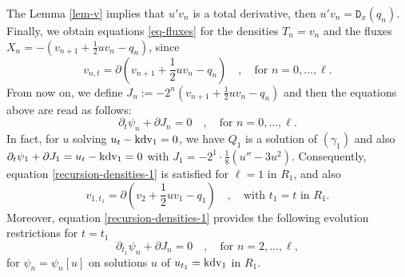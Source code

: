 \documentclass[a4paper,12pt]{article}
\def\kdv{\rm kdv}
\def\D{\texttt{D}}
\begin{document}
The Lemma \ref{lem-v} implies that  $u' v_n$ is a total derivative, then $u' v_n =\D_x(q_n )$. Finally, we obtain equations \eqref{eq-fluxes} for the densities $T_n = v_n $ and the fluxes $X_n =-(v_{n+1} +\frac12  uv_{n}-q_n)$, since
\begin{equation*}
   v_{n,t}= 
   \partial \left( v_{n+1} +\frac12  uv_{n}-q_n \right) \quad , \quad \textrm{for } n=0, \dots ,\ell .   
\end{equation*}
From now on, we define $J_n := -2^{n} (v_{n+1} +\frac12  uv_{n}-q_n )$ and then the equations above are read as follows:
\begin{equation}\label{eq-time-v}
    \partial_t \psi_n + \partial J_n =0 \quad , \quad \textrm{for } n=0, \dots ,\ell . 
\end{equation}
In fact, for $u$ solving $u_t -\kdv_1 =0$, we have $Q_1 $ is a solution of $(\gamma_1 )$   and also $\partial_t \psi_1 + \partial J_1 =u_t -\kdv_1 =0$ with $J_1 = -2^{1}\cdot  \frac18 (u''-3u^2 )$. Consequently, equation \eqref{recursion-densities-1} is satisfied for $\ell=1$ in $R_1$, and also
\[
 v_{1,t_1}= 
   \partial \left( v_{2} +\frac12  uv_{1}-q_1 \right) \quad , \quad \textrm{with $t_1 = t $  in } R_1 .
\]
Moreover, equation \eqref{recursion-densities-1} provides the following evolution restrictions for $t=t_1$
\begin{equation}\label{eq-time-t1-v}
    \partial_{t_{1}} \psi_n + \partial J_n =0 \quad , \quad \textrm{for } n=2, \dots ,\ell , 
\end{equation}
for $\psi_n =\psi_n [u]$  on solutions $u$ of $u_{t_{1}} =\kdv_1$ in $R_1$.
\medskip

\end{document}
